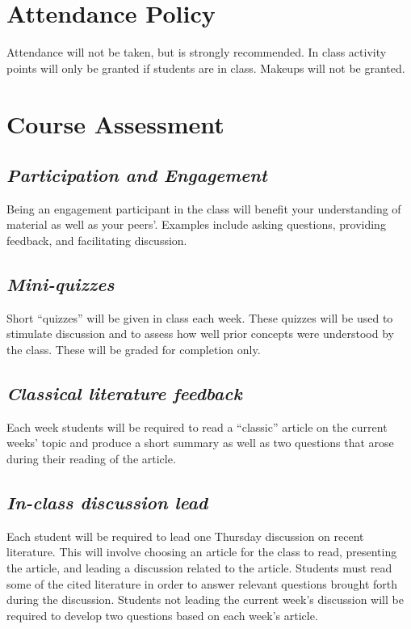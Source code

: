\documentclass[12pt, notitlepage]{article}   	%
\begin{document}
\section{Attendance Policy}
Attendance will not be taken, but is strongly recommended. 
In class activity points will only be granted if students are in class.
Makeups will not be granted.

\section{Course Assessment}
\subsection{\textit{Participation and Engagement}}
Being an engagement participant in the class will benefit your understanding
of material as well as your peers'. Examples include asking questions, providing feedback,
and facilitating discussion.

\subsection{\textit{Mini-quizzes}}
Short “quizzes” will be given in class each week. 
These quizzes will be used to stimulate discussion and to assess how well 
prior concepts were understood by the class. 
These will be graded for completion only. 

\subsection{\textit{Classical literature feedback}}
Each week students will be required to read a “classic” article on the current weeks’ 
topic and produce a short summary as well as two questions that arose during their 
reading of the article. 

\subsection{\textit{In-class discussion lead}}
Each student will be required to lead one Thursday discussion on recent literature. 
This will involve choosing an article for the class to read, presenting the article, 
and leading a discussion related to the article. Students must read some of the cited
literature in order to answer relevant questions brought forth during the discussion.
Students not leading the current week’s 
discussion will be required to develop two questions based on each week’s article. 
\end{document}
